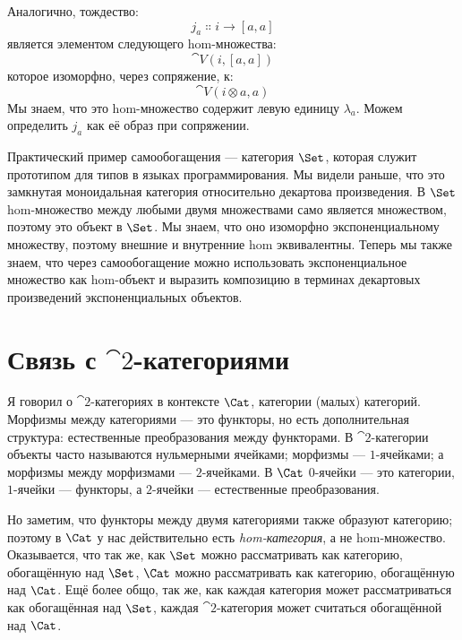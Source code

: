 Аналогично, тождество:
\[j_a \Colon i \to [a, a]\]
является элементом следующего hom-множества:
\[\cat{V}(i, [a, a])\]
которое изоморфно, через сопряжение, к:
\[\cat{V}(i \otimes a, a)\]
Мы знаем, что это hom-множество содержит левую единицу $\lambda_a$. Можем
определить $j_a$ как её образ при сопряжении.

Практический пример самообогащения — категория $\Set$, которая
служит прототипом для типов в языках программирования. Мы видели
раньше, что это замкнутая моноидальная категория относительно декартова
произведения. В $\Set$ hom-множество между любыми двумя множествами само является
множеством, поэтому это объект в $\Set$. Мы знаем, что оно изоморфно
экспоненциальному множеству, поэтому внешние и внутренние hom
эквивалентны. Теперь мы также знаем, что через самообогащение можно использовать
экспоненциальное множество как hom-объект и выразить композицию в терминах
декартовых произведений экспоненциальных объектов.

\section{Связь с $\cat{2}$-категориями}

Я говорил о $\cat{2}$-категориях в контексте $\Cat$, категории
(малых) категорий. Морфизмы между категориями — это функторы,
но есть дополнительная структура: естественные преобразования между
функторами. В $\cat{2}$-категории объекты часто называются нульмерными ячейками;
морфизмы — $1$-ячейками; а морфизмы между морфизмами — $2$-ячейками. В
$\Cat$ $0$-ячейки — это категории, $1$-ячейки — функторы, а
$2$-ячейки — естественные преобразования.

Но заметим, что функторы между двумя категориями также образуют категорию; поэтому
в $\Cat$ у нас действительно есть \emph{hom-категория}, а не
hom-множество. Оказывается, что так же, как $\Set$ можно рассматривать как
категорию, обогащённую над $\Set$, $\Cat$ можно рассматривать как
категорию, обогащённую над $\Cat$. Ещё более общо, так же, как
каждая категория может рассматриваться как обогащённая над $\Set$, каждая
$\cat{2}$-категория может считаться обогащённой над $\Cat$.
